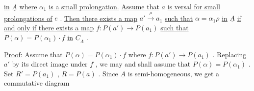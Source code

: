 \begin{center}
\end{center}
\underline{in}  $\underline{A}$  \underline{where}  $\alpha_1$  \underline{is a small prolongation.} \underline{Assume that}  $a$  \underline{is versal for small} \underline{prolongations of}  $e$  . \underline{Then there exists a map}  $a' \xrightarrow{\ \rho\ } a_1$  \underline{such that}  $\alpha = \alpha_1 \rho$ \underline{in}  $\underline{A}$  \underline{if and only if there exists a map}  $f : P(a') \rightarrow P(a_1)$  \underline{such that} $P(\alpha) = P(\alpha_1)\cdot f$  \underline{in}  $\underline{C}_{\Lambda}$  .

\underline{Proof}:  Assume that  $P(\alpha) = P(\alpha_1)\cdot f$  where  $f : P(a') \rightarrow P(a_1)$  . Replacing  $a'$ by its direct image under  $f$  , we may and shall assume that  $P(\alpha) = P(\alpha_1)$  . Set  $R' = P(a_1)$  ,  $R = P(a)$  . Since  $\underline{A}$  is semi-homogeneous, we get a commutative diagram

